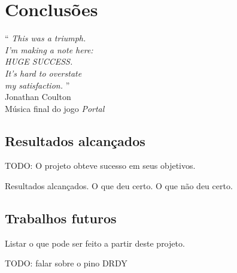 \documentclass[brazil,pagestart=firstchapter]{abnt}
\begin{document}
\chapter{Conclusões}
\label{cap:conclusoes}


\vfill{}
\begin{flushright}{}
``\emph{
	This was a triumph.    \\
	I'm making a note here:\\
	HUGE SUCCESS.          \\
	It's hard to overstate \\
	my satisfaction.
}''\\
{\small Jonathan Coulton} \\
{\small Música final do jogo \textit{Portal}}
\end{flushright}{\small \par}
\vfill{}

\newpage


\section{Resultados alcançados}
\label{sec:resultados}

TODO: O projeto obteve sucesso em seus objetivos.

Resultados alcançados. O que deu certo. O que não deu certo.

\section{Trabalhos futuros}
\label{sec:trabalhos_futuros}

Listar o que pode ser feito a partir deste projeto.

TODO: falar sobre o pino DRDY
\end{document}
